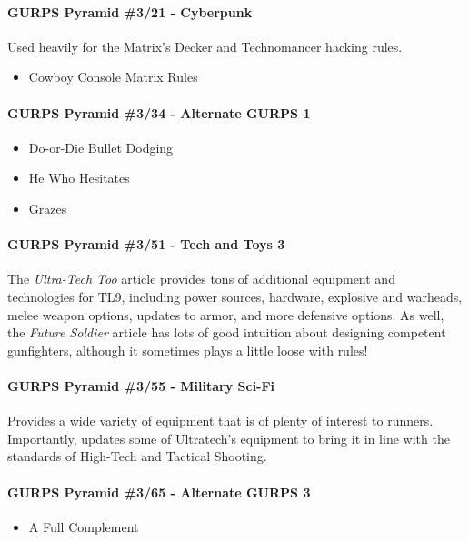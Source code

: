 \begin{multicols*}{3}
	\paragraph{GURPS Pyramid \#3/21 - Cyberpunk}
	Used heavily for the Matrix's Decker and Technomancer hacking rules.
	
	\begin{itemize}
		\itemsep0em
		\item  Cowboy Console Matrix Rules
	\end{itemize}
	
	\paragraph{GURPS Pyramid \#3/34 - Alternate GURPS 1}
	
	\begin{itemize} 
		\itemsep0em 
		\item Do-or-Die Bullet Dodging
		\item He Who Hesitates
		\item Grazes
	\end{itemize}

	\paragraph{GURPS Pyramid \#3/51 - Tech and Toys 3}
	The \textit{Ultra-Tech Too} article provides tons of additional equipment and technologies for TL9, including power sources, hardware, explosive and warheads, melee weapon options, updates to armor, and more defensive options. As well, the \textit{Future Soldier} article has lots of good intuition about designing competent gunfighters, although it sometimes plays a little loose with rules!
	
	\paragraph{GURPS Pyramid \#3/55 - Military Sci-Fi}
	Provides a wide variety of equipment that is of plenty of interest to runners. Importantly, updates some of Ultratech's equipment to bring it in line with the standards of High-Tech and Tactical Shooting.
	
	\paragraph{GURPS Pyramid \#3/65 - Alternate GURPS 3}
	\begin{itemize}
		\itemsep0em 
		\item A Full Complement
	\end{itemize}


\end{multicols*}
